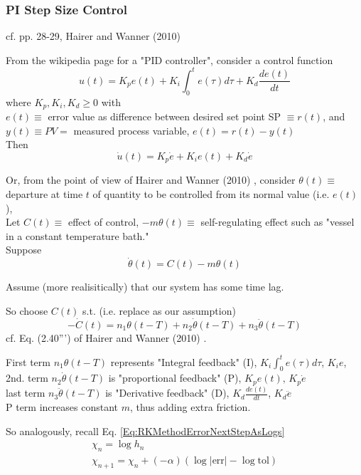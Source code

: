 \documentclass[10pt]{amsart}
\begin{document}
\begin{multicols*}{2}
\subsubsection{PI Step Size Control}

cf. pp. 28-29, Hairer and Wanner (2010) \cite{HaWa2010}

From the wikipedia page for a "PID controller", consider a control function
\[
u(t) = K_p e(t) + K_i \int_0^t e(\tau) d\tau + K_d \frac{de(t)}{dt}
\]
where $K_p, K_i, K_d \geq 0$ with \\
$e(t) \equiv$ error value as difference between desired set point SP $\equiv r(t)$, and \\
$y(t) \equiv PV =$ measured process variable, $e(t) = r(t) - y(t)$ \\

Then
\[
\dot{u}(t) = K_p \dot{e} + K_i e(t) + K_d \dot{e}
\]

Or, from the point of view of Hairer and Wanner (2010) \cite{HaWa2010}, consider $\theta(t) \equiv$ departure at time $t$ of quantity to be controlled from its normal value (i.e. $e(t)$), \\
Let $C(t) \equiv$ effect of control, $-m\theta(t) \equiv$ self-regulating effect such as "vessel in a constant temperature bath." \\

Suppose
\[
\dot{\theta}(t) = C(t) - m\theta(t)
\]

Assume (more realisitically) that our system has some time lag.

So choose $C(t)$ s.t. (i.e. replace as our assumption)
\[
-\dot{C}(t) = n_1 \theta(t-T) + n_2 \dot{\theta}(t-T) + n_3 \ddot{\theta}(t-T)
\]
cf. Eq. (2.40''') of Hairer and Wanner (2010) \cite{HaWa2010}.

First term $n_1\theta(t-T)$ represents "Integral feedback" (I), $K_i \int_0^t e(\tau) d\tau$, $K_ie$, \\
2nd. term $n_2 \dot{\theta}(t-T)$ is "proportional feedback" (P), $K_pe(t), \, K_p \dot{e}$ \\
last term $n_3 \ddot{\theta}(t-T)$ is "Derivative feedback" (D), $K_d \frac{de(t)}{dt}$, $K_d\ddot{e}$ \\

P term increases constant $m$, thus adding extra friction.

So analogously, recall Eq. \ref{Eq:RKMethodErrorNextStepAsLogs}
\[
\begin{gathered}
\chi_n = \log{h_n} \\
\chi_{n+1} = \chi_n + (-\alpha) (\log{ |\text{err}|} - \log{\text{tol}})	
\end{gathered}
\]


\end{multicols*}
\end{document}
